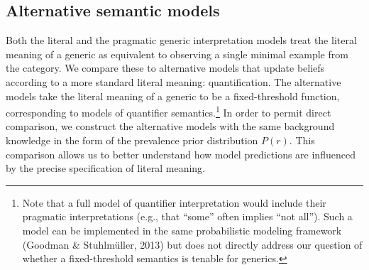 \documentclass[floatsintext,doc]{apa6}
\let\rmarkdownfootnote\footnote%
\def\footnote{\protect\rmarkdownfootnote}
\begin{document}





\hypertarget{alternative-semantic-models}{%
\subsection{Alternative semantic models}\label{alternative-semantic-models}}

Both the literal and the pragmatic generic interpretation models treat the literal meaning of a generic as equivalent to observing a single minimal example from the category.
We compare these to alternative models that update beliefs according to a more standard literal meaning: quantification.
The alternative models take the literal meaning of a generic to be a fixed-threshold function, corresponding to models of quantifier semantics.\footnote{Note that a full model of quantifier interpretation would include their pragmatic interpretations (e.g., that \enquote{some} often implies \enquote{not all}). Such a model can be implemented in the same probabilistic modeling framework (Goodman \& Stuhlmüller, 2013) but does not directly address our question of whether a fixed-threshold semantics is tenable for generics.} 
In order to permit direct comparison, we construct the alternative models with the same background knowledge in the form of the prevalence prior distribution \(P(r)\).
This comparison allows us to better understand how model predictions are influenced by the precise specification of literal meaning.
\end{document}
